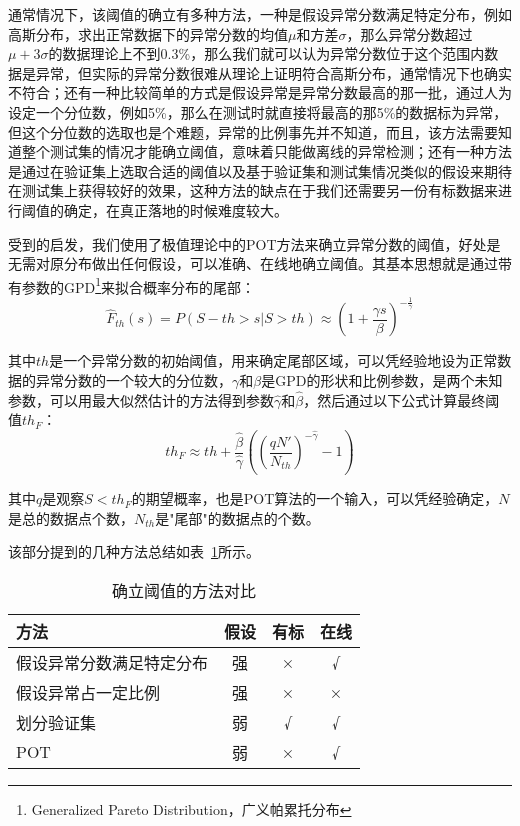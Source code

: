通常情况下，该阈值的确立有多种方法，一种是假设异常分数满足特定分布，例如高斯分布，求出正常数据下的异常分数的均值$\mu$和方差$\sigma$，那么异常分数超过$\mu + 3\sigma$的数据理论上不到0.3\%，那么我们就可以认为异常分数位于这个范围内数据是异常，但实际的异常分数很难从理论上证明符合高斯分布，通常情况下也确实不符合；还有一种比较简单的方式是假设异常是异常分数最高的那一批，通过人为设定一个分位数，例如5\%，那么在测试时就直接将最高的那5\%的数据标为异常，但这个分位数的选取也是个难题，异常的比例事先并不知道，而且，该方法需要知道整个测试集的情况才能确立阈值，意味着只能做离线的异常检测；还有一种方法是通过在验证集上选取合适的阈值以及基于验证集和测试集情况类似的假设来期待在测试集上获得较好的效果，这种方法的缺点在于我们还需要另一份有标数据来进行阈值的确定，在真正落地的时候难度较大。

受到\cite{siffer2017anomaly}的启发，我们使用了极值理论中的POT方法来确立异常分数的阈值，好处是无需对原分布做出任何假设，可以准确、在线地确立阈值。其基本思想就是通过带有参数的GPD\footnote{Generalized Pareto Distribution，广义帕累托分布}来拟合概率分布的尾部：
\begin{equation*}
  \hat{F}_{th}(s) = P(S - th > s | S > th) \approx (1 + \frac{\gamma s}{\beta})^{-\frac{1}{\gamma}}
\end{equation*}

其中$th$是一个异常分数的初始阈值，用来确定尾部区域，可以凭经验地设为正常数据的异常分数的一个较大的分位数，$\gamma$和$\beta$是GPD的形状和比例参数，是两个未知参数，可以用最大似然估计的方法得到参数$\hat{\gamma}$和$\hat{\beta}$，然后通过以下公式计算最终阈值$th_F$：
\begin{equation*}
  th_F \approx th + \frac{\hat{\beta}}{\hat{\gamma}}((\frac{qN'}{N_{th}})^{-\hat{\gamma}}-1)
\end{equation*}

其中$q$是观察$S<th_F$的期望概率，也是POT算法的一个输入，可以凭经验确定，$N$是总的数据点个数，$N_{th}$是"尾部"的数据点的个数。

该部分提到的几种方法总结如表~\ref{tab:threshold}所示。


\begin{table}[htbp]
  \centering
  \begin{tabular}{lccc}
    \toprule
    方法 & 假设 & 有标 & 在线 \\
    \midrule
    假设异常分数满足特定分布 & 强 & × & √ \\
    假设异常占一定比例 & 强 & × & × \\
    划分验证集 & 弱 & √ & √ \\
    POT & 弱 & × & √\\
    \bottomrule
   \end{tabular}
   \caption{确立阈值的方法对比}
   \label{tab:threshold}
\end{table}

